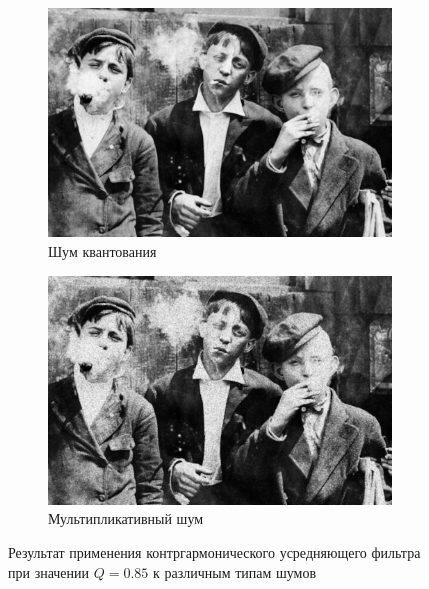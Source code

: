 \begin{figure}[ht!]
\begin{subfigure}[b]{0.5\linewidth}
      \includegraphics[width=0.95\linewidth]{../Contraharmonic_Filter/Contraharmonic_Poisson_noise_(m,n=(3,_3),q=0.85).jpg} 
      \caption{Шум квантования} 
      \label{contraharmonic_0.85:e}
    \end{subfigure}%
    \begin{subfigure}[b]{0.5\linewidth}
        \centering
        \includegraphics[width=0.95\linewidth]{../Contraharmonic_Filter/Contraharmonic_Speckle_noise_(m,n=(3,_3),q=0.85).jpg} 
        \caption{Мультипликативный шум} 
        \label{contraharmonic_0.85:f} 
    \end{subfigure} 
    \caption{Результат применения контргармонического усредняющего фильтра при значении $Q = 0.85$ к различным типам шумов}
    \label{img:contraharmonic_0.85} 
  \end{figure}

